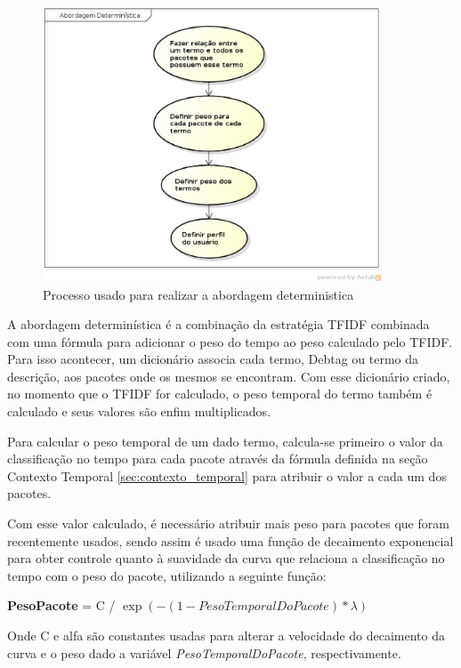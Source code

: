 \begin{figure}[h]
  \centering
  \includegraphics[width=0.9\textwidth]{figuras/abordagem_deterministica.eps}
  \caption{Processo usado para realizar a abordagem deterministica}
  \label{fig:abordagem_deterministica}
\end{figure}

A abordagem determinística é a combinação da estratégia TFIDF combinada com
uma fórmula para adicionar o peso do tempo ao peso calculado pelo TFIDF. Para
isso acontecer, um dicionário associa cada termo, Debtag ou termo da
descrição, aos pacotes onde os mesmos se encontram. Com esse dicionário criado,
no momento que o TFIDF for calculado, o peso temporal do termo também é
calculado e seus valores são enfim multiplicados.

Para calcular o peso temporal de um dado termo, calcula-se primeiro o valor da
classificação no tempo para cada pacote através da fórmula definida na seção
Contexto Temporal \ref{sec:contexto_temporal} para atribuir o valor
a cada um dos pacotes.

Com esse valor calculado, é necessário atribuir mais peso para pacotes que
foram recentemente usados, sendo assim é usado uma função de decaimento
exponencial para obter controle quanto à suavidade da curva que relaciona
a classificação no tempo com o peso do pacote, utilizando a seguinte função:

\textbf{PesoPacote} = C / $\exp\left(-({1 - PesoTemporalDoPacote}) * {\lambda}\right)$

Onde C e alfa são constantes usadas para alterar a velocidade do decaimento da
curva e o peso dado a variável \textit{PesoTemporalDoPacote}, respectivamente.

